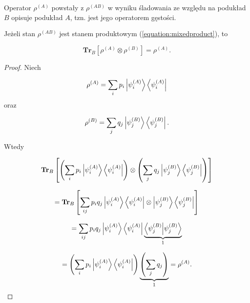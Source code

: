 Operator $\rho ^ {(A)}$ powstały z $\rho ^ {(AB)}$ w wyniku śladowania ze względu na podukład $B$ opisuje podukład $A$, tzn. jest jego operatorem gęstości.

\begin{fact}
    Jeżeli stan $\rho ^ {(AB)}$ jest stanem produktowym (\ref{equation:mixedproduct}), to

    \begin{equation}
        \textbf{Tr}_B[\rho ^ {(A)} \otimes \rho ^ {(B)}] = \rho ^ {(A)}.
    \end{equation}
\end{fact}

\begin{proof}
    Niech

    $$
        \rho ^ {(A)} = \sum\limits_{i} p_{i} \ket{\psi_{i} ^ {(A)}} \bra{\psi_{i}^{(A)}}
    $$
    oraz

    $$
        \rho ^ {(B)} = \sum\limits_{j} q_{j} \ket{\psi_{j}^{(B)}} \bra{\psi_{j}^{(B)}}.
    $$

    Wtedy

    $$
        \textbf{Tr}_B\left[\left(\sum\limits_{i} p_{i} \ket{\psi_{i}^{(A)}} \bra{\psi_{i}^{(A)}}\right) \otimes \left(\sum\limits_{j} q_{j} \ket{\psi_{j}^{(B)}} \bra{\psi_{j}^{(B)}}\right)\right]
    $$

    $$
        = \textbf{Tr}_B\left[\sum\limits_{ij} p_{i} q_{j} \ket{\psi_{i}^{(A)}} \bra{\psi_{i}^{(A)}} \otimes \ket{\psi_{j}^{(B)}} \bra{\psi_{j}^{(B)}}\right]
    $$

    $$
        = \sum\limits_{ij} p_{i} q_{j} \ket{\psi_{i}^{(A)}} \bra{\psi_{i}^{(A)}} \underbrace{\bra{\psi_{j}^{(B)}}\ket{\psi_{j}^{(B)}}}_{1}
    $$

    $$
        = \left(\sum\limits_{i} p_{i} \ket{\psi_{i}^{(A)}} \bra{\psi_{i}^{(A)}}\right) \underbrace{\left(\sum\limits_{j} q_{j}\right)}_{1} = \rho ^ {(A)}.
    $$
\end{proof}
